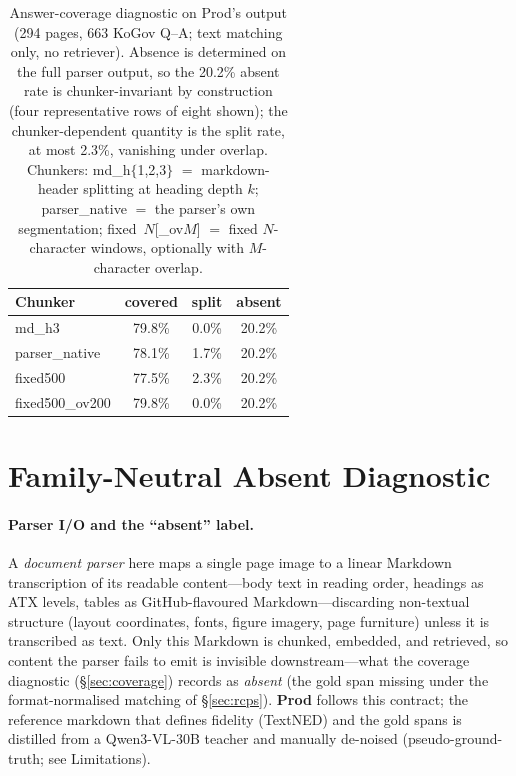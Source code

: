 \documentclass[11pt]{article}
\begin{document}
\begin{table}[h]
\centering\small
\begin{tabular}{lccc}
\toprule
Chunker & covered & split & absent \\
\midrule
md\_h3 & 79.8\% & 0.0\% & 20.2\% \\
parser\_native & 78.1\% & 1.7\% & 20.2\% \\
fixed500 & 77.5\% & 2.3\% & 20.2\% \\
fixed500\_ov200 & 79.8\% & 0.0\% & 20.2\% \\
\bottomrule
\end{tabular}
\caption{Answer-coverage diagnostic on Prod's output (294 pages, 663 KoGov Q--A; text matching only, no retriever). Absence is determined on the full parser output, so the 20.2\% absent rate is chunker-invariant by construction (four representative rows of eight shown); the chunker-dependent quantity is the split rate, at most 2.3\%, vanishing under overlap. Chunkers: md\_h$\{$1,2,3$\}$ $=$ markdown-header splitting at heading depth $k$; parser\_native $=$ the parser's own segmentation; fixed~$N$[\_ov$M$] $=$ fixed $N$-character windows, optionally with $M$-character overlap.}
\label{tab:coverage}
\end{table}

\section{Family-Neutral Absent Diagnostic}
\label{app:familyneutral}

\paragraph{Parser I/O and the ``absent'' label.}
\label{sec:parser-def}
A \emph{document parser} here maps a single page image to a linear Markdown transcription of its readable content---body text in reading order, headings as ATX levels, tables as GitHub-flavoured Markdown---discarding non-textual structure (layout coordinates, fonts, figure imagery, page furniture) unless it is transcribed as text. Only this Markdown is chunked, embedded, and retrieved, so content the parser fails to emit is invisible downstream---what the coverage diagnostic (\S\ref{sec:coverage}) records as \emph{absent} (the gold span missing under the format-normalised matching of \S\ref{sec:rcps}). \textbf{Prod} follows this contract; the reference markdown that defines fidelity (TextNED) and the gold spans is distilled from a Qwen3-VL-30B teacher and manually de-noised (pseudo-ground-truth; see Limitations).
\end{document}
